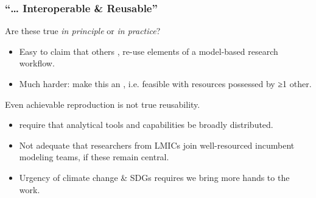 \documentclass[12pt,aspectratio=169]{beamer}
\begin{document}
\begin{frame}
\frametitle{“… Interoperable \& Reusable”}

Are these true \emph{in principle} or \emph{in practice}?
\begin{itemize}
  \item Easy to claim that others , re-use elements of a model-based research workflow.
  \item Much harder: make this an , i.e. feasible with resources possessed by ≥1 other.
\end{itemize}

\medskip
Even achievable reproduction is not true reusability.
\begin{itemize}
  \item {} require that analytical tools and capabilities be broadly distributed.
  \item Not adequate that researchers from LMICs join well-resourced incumbent modeling teams, if these remain central.
  \item Urgency of climate change \& SDGs requires we bring more hands to the work.
\end{itemize}

\end{frame}

\end{document}

